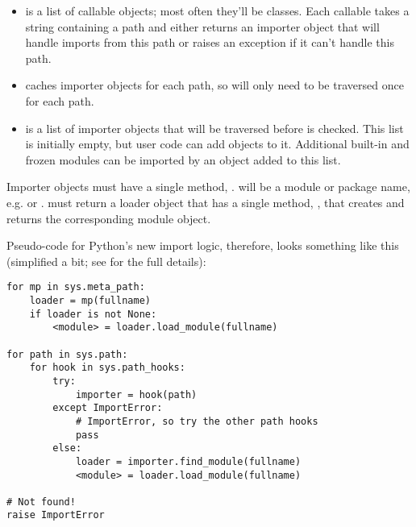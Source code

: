 \documentclass{howto}
\begin{document}
\begin{itemize}
  \item {} is a list of callable objects; most 
  often they'll be classes.  Each callable takes a string containing a
  path and either returns an importer object that will handle imports
  from this path or raises an  exception if it
  can't handle this path.

  \item {} caches importer objects for
  each path, so  will only need to be traversed
  once for each path.

  \item {} is a list of importer objects that will
  be traversed before  is checked.  This list is
  initially empty, but user code can add objects to it.  Additional
  built-in and frozen modules can be imported by an object added to
  this list.

\end{itemize}

Importer objects must have a single method,
.  
will be a module or package name, e.g.  or
.   must return a loader object
that has a single method, , that
creates and returns the corresponding module object.

Pseudo-code for Python's new import logic, therefore, looks something
like this (simplified a bit; see  for the full details):

\begin{verbatim}
for mp in sys.meta_path:
    loader = mp(fullname)
    if loader is not None:
        <module> = loader.load_module(fullname)
        
for path in sys.path:
    for hook in sys.path_hooks:
        try:
            importer = hook(path)
        except ImportError:
            # ImportError, so try the other path hooks
            pass
        else:
            loader = importer.find_module(fullname)
            <module> = loader.load_module(fullname)

# Not found!
raise ImportError
\end{verbatim}

\begin{seealso}


\end{seealso}
\end{document}
